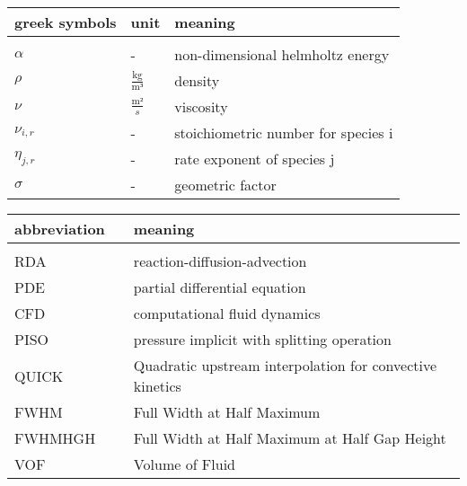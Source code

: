 \documentclass[../thesis.tex]{subfiles}
\begin{document}
\small
\begin{tabular}{p{4cm}p{3cm}p{8cm}}
	\textbf{greek symbols} & \textbf{unit} & \textbf{meaning} \\ 
	\hline \\[\dimexpr-\normalbaselineskip+2pt] 
	$\alpha$ & - & non-dimensional helmholtz energy \\
	$\rho$ & $\frac{\text{kg}}{\text{m³}}$ & density \\
	$\nu$ & $\frac{\text{m²}}{s}$ & viscosity\\
	$\nu_{i,r}$& - & stoichiometric number for species i \\
	$\eta_{j,r}$& - & rate exponent of species j \\
	$\sigma$ & - & geometric factor \\
\end{tabular}
\vspace{1cm}

\small
\begin{tabular}{p{4cm}p{3cm}p{8cm}}
	\textbf{abbreviation} & & \textbf{meaning} \\ 
	\hline \\[\dimexpr-\normalbaselineskip+2pt] 
	RDA & & reaction-diffusion-advection \\
	PDE & & partial differential equation \\
	CFD && computational fluid dynamics \\
	PISO & & pressure implicit with splitting operation \\
	QUICK & & Quadratic upstream interpolation for convective kinetics \\
	FWHM & & Full Width at Half Maximum \\
	FWHMHGH & & Full Width at Half Maximum at Half Gap Height \\
	VOF & & Volume of Fluid \\
\end{tabular}

\listoffigures
\listoftables
\end{document}
